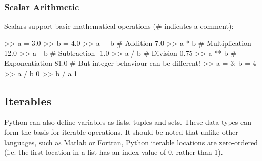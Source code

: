 \subsubsection{Scalar Arithmetic}

Scalars support basic mathematical operations (\# indicates a comment):

\begin{python}[frame=single]
>> a = 3.0
>> b = 4.0
>> a + b # Addition
7.0
>> a * b # Multiplication
12.0
>> a - b # Subtraction
-1.0
>> a / b # Division
0.75
>> a ** b  # Exponentiation
81.0
# But integer behaviour can be different!
>> a = 3; b = 4
>> a / b
0
>> b / a
1
\end{python}

\subsection{Iterables}

Python can also define variables as lists, tuples and sets. These data types can form the basis for iterable operations. It should be noted that unlike other languages, such as Matlab or Fortran, Python iterable locations are zero-ordered (i.e. the first location in a list has an index value of 0, rather than 1).


